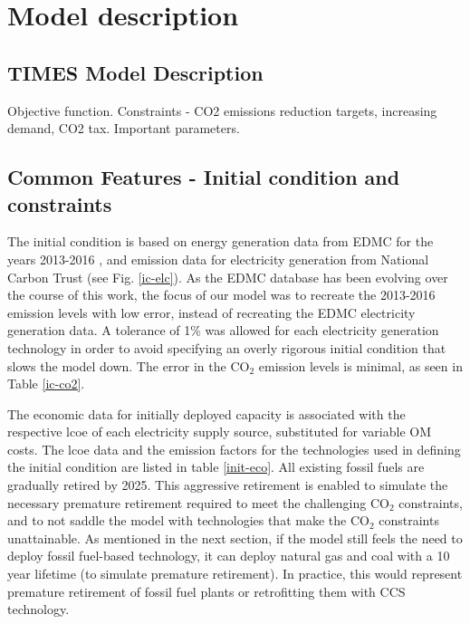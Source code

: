 \section{Model description} \label{Model-description}

\subsection{TIMES Model Description}
Objective function.
Constraints - CO2 emissions reduction targets, increasing demand, CO2 tax.
Important parameters.

\subsection{Common Features - Initial condition and constraints}

The initial condition is based on energy generation data from \gls{EDMC} for the years 2013-2016 , and emission data for electricity generation from National Carbon Trust (see Fig. \ref{ic-elc}). As the \gls{EDMC} database has been evolving over the course of this work, the focus of our model was to recreate the 2013-2016 emission levels with low error, instead of recreating the \gls{EDMC} electricity generation data. A tolerance of 1\% was allowed for each electricity generation technology in order to avoid specifying an overly rigorous initial condition that slows the model down. The error in the CO$_2$ emission levels is minimal, as seen in Table \ref{ic-co2}.

The economic data for initially deployed capacity is associated with the respective \gls{lcoe} of each electricity supply source, substituted for variable \gls{OM} costs. The \gls{lcoe} data and the emission factors for the technologies used in defining the initial condition are listed in table \ref{init-eco}. All existing fossil fuels are gradually retired by 2025. This aggressive retirement is enabled to simulate the necessary premature retirement required to meet the challenging CO$_2$ constraints, and to not saddle the model with technologies that make the CO$_2$ constraints unattainable. As mentioned in the next section, if the model still feels the need to deploy fossil fuel-based technology, it can deploy natural gas and coal with a 10 year lifetime (to simulate premature retirement). In practice, this would represent premature retirement of fossil fuel plants or retrofitting them with \gls{CCS} technology.

